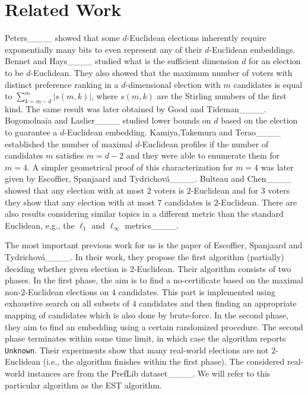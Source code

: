 \section{Related Work}
Peters____ showed that some $d$-Euclidean elections inherently require exponentially many bits to even represent any of their $d$-Euclidean embeddings. Bennet and Hays____ studied what is the sufficient dimension $d$ for an election to be $d$-Euclidean. They also showed that the maximum number of voters with distinct preference ranking in a $d$-dimensional election with $m$ candidates is equal to $\sum_{k=m-d}^m |s(m,k)|$, where $s(m,k)$ are the Stirling numbers of the first kind. The same result was later obtained by Good and Tideman____. Bogomolnaïa and Laslier____ studied lower bounds on $d$ based on the election to guarantee a $d$-Euclidean embedding. Kamiya,Takemura and Terao____ established the number of maximal $d$-Euclidean profiles if the number of candidates $m$ satisfies $m=d-2$ and they were able to enumerate them for $m=4$. A simpler geometrical proof of this characterization for $m=4$ was later given by Escoffier, Spanjaard and Tydrichová____. Bulteau and Chen____ showed that any election with at most $2$ voters is $2$-Euclidean and for $3$ voters they show that any election with at most $7$ candidates is $2$-Euclidean.  There are also results considering similar topics  in a different metric than the standard Euclidean, e.g., the $\ell_1$ and $\ell_\infty$ metrics____. 

The most important previous work for us is the paper of Escoffier, Spanjaard and Tydrichová____. In their work, they propose the first algorithm (partially) deciding whether given election is $2$-Euclidean. Their algorithm consists of two phases. In the first phase, the aim is to find a no-certificate based on the maximal non-$2$-Euclidean elections on $4$ candidates. This part is implemented using exhaustive search on all subsets of $4$ candidates and then finding an appropriate mapping of candidates which is also done by brute-force. In the second phase, they aim to find an embedding using a certain randomized procedure. The second phase terminates within some time limit, in which case the algorithm reports \texttt{Unknown}. Their experiments show that many real-world elections are not $2$-Euclidean (i.e., the algorithm finishes within the first phase). The considered real-world instances are from the PrefLib dataset____. We will refer to this particular algorithm as the EST algorithm.
